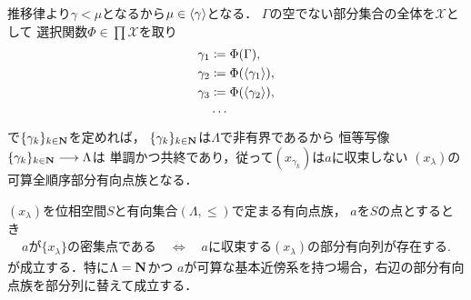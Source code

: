 \begin{prf}
				推移律より$\gamma < \mu$となるから$\mu \in \inprod<\gamma>$となる．
				$\Gamma$の空でない部分集合の全体を$\mathscr{X}$として
				選択関数$\Phi \in \prod \mathscr{X}$を取り
				\begin{align}
					\gamma_1 &\coloneqq \Phi(\Gamma), \\
					\gamma_2 &\coloneqq \Phi(\inprod<\gamma_1>), \\
					\gamma_3 &\coloneqq \Phi(\inprod<\gamma_2>), \\
					&\cdots
				\end{align}
				で$\{\gamma_k\}_{k \in \mathbf{N}}$を定めれば，
				$\{\gamma_k\}_{k \in \mathbf{N}}$は$\Lambda$で非有界であるから
				恒等写像$\{\gamma_k\}_{k \in \mathbf{N}} \longrightarrow \Lambda$は
				単調かつ共終であり，従って$(x_{\gamma_k})$は$a$に収束しない
				$(x_\lambda)$の可算全順序部分有向点族となる．
				\QED
	\end{prf}
	
	\begin{screen}
		\begin{thm}[有向点族の密集点に対する収束部分点族の存在]
			$(x_\lambda)$を位相空間$S$と有向集合$(\Lambda,\leq)$で定まる有向点族，
			$a$を$S$の点とするとき
			\begin{align}
				\mbox{$a$が$\{x_\lambda\}$の密集点である}
				\quad \Longleftrightarrow \quad
				\mbox{$a$に収束する$(x_\lambda)$の部分有向列が存在する}.
			\end{align}
			が成立する．特に$\Lambda = \mathbf{N}$かつ
			$a$が可算な基本近傍系を持つ場合，右辺の部分有向点族を部分列に替えて成立する．
		\end{thm}
	\end{screen}
	
